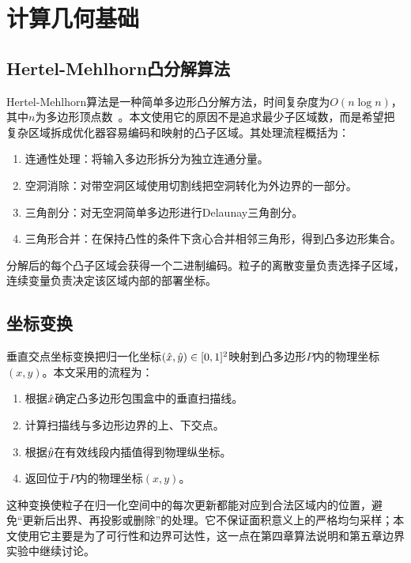 \section{计算几何基础}

\subsection{Hertel-Mehlhorn凸分解算法}

Hertel-\allowbreak Mehlhorn算法是一种简单多边形凸分解方法，时间复杂度为$O(n\log n)$，其中$n$为多边形顶点数~\cite{Hertel1983}。本文使用它的原因不是追求最少子区域数，而是希望把复杂区域拆成优化器容易编码和映射的凸子区域。其处理流程概括为：

\begin{enumerate}
    \item 连通性处理：将输入多边形拆分为独立连通分量。
    \item 空洞消除：对带空洞区域使用切割线把空洞转化为外边界的一部分。
    \item 三角剖分：对无空洞简单多边形进行Delaunay三角剖分。
    \item 三角形合并：在保持凸性的条件下贪心合并相邻三角形，得到凸多边形集合。
\end{enumerate}

分解后的每个凸子区域会获得一个二进制编码。粒子的离散变量负责选择子区域，连续变量负责决定该区域内部的部署坐标。

\subsection{坐标变换}

垂直交点坐标变换把归一化坐标$(\hat{x}, \hat{y})\in[0,1]^2$映射到凸多边形$P$内的物理坐标$(x,y)$。本文采用的流程为：

\begin{enumerate}
    \item 根据$\hat{x}$确定凸多边形包围盒中的垂直扫描线。
    \item 计算扫描线与多边形边界的上、下交点。
    \item 根据$\hat{y}$在有效线段内插值得到物理纵坐标。
    \item 返回位于$P$内的物理坐标$(x,y)$。
\end{enumerate}

这种变换使粒子在归一化空间中的每次更新都能对应到合法区域内的位置，避免“更新后出界、再投影或删除”的处理。它不保证面积意义上的严格均匀采样；本文使用它主要是为了可行性和边界可达性，这一点在第四章算法说明和第五章边界实验中继续讨论。

